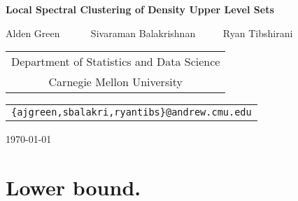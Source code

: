 \documentclass[11pt,twoside]{article}
\newcommand{\1}{\mathbf{1}}
\begin{document}
	
	\begin{center} {\Large{\bf{Local Spectral Clustering of Density Upper Level Sets}}}
		
		\vspace*{.3cm}
		
		{\large{
				\begin{center}
					Alden Green ~~~~~ Sivaraman Balakrishnan~~~~~ Ryan Tibshirani\\
					\vspace{.2cm}
				\end{center}
				
				
				\begin{tabular}{c}
					Department of Statistics and Data Science \\
					Carnegie Mellon University
				\end{tabular}
				
				\vspace*{.2in}
				
				\begin{tabular}{c}
					\texttt{\{ajgreen,sbalakri,ryantibs\}@andrew.cmu.edu}
				\end{tabular}
		}}
		
		\vspace*{.2in}
		
		\today
		\vspace*{.2in}
	
	\end{center}

\section{Lower bound.}
\label{sec:lower_bound.}
\end{document}
